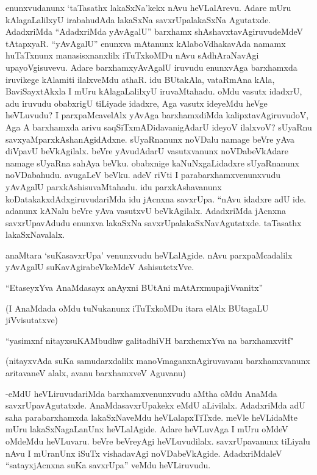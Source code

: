 enunxvudanunx `taTasathx lakaSxNa'kekx nAvu heVLalArevu. Adare mUru kAlagaLalilxyU irabahudAda lakaSxNa savxrUpalakaSxNa Agutatxde. AdadxriMda ``AdadxriMda yAvAgalU'' barxhamx shAshavxtavAgiruvudeMdeV tAtapxyaR. ``yAvAgalU'' enunxva mAtanunx kAlaboVdhakavAda namamx huTaTxnunx manasisxnanxlilx iTuTxkoMDu nAvu sAdhAraNavAgi upayoVgisuvevu. Adare barxhamxyAvAgalU iruvudu enunxvAga barxhamxda iruvikege kAlamiti ilalxveMdu athaR. idu BUtakAla, vataRmAna kAla, BaviSayxtAkxla I mUru kAlagaLalilxyU iruvaMtahadu. oMdu vasutx idadxrU, adu iruvudu obabxrigU tiLiyade idadxre, Aga vasutx ideyeMdu heVge heVLuvudu? I parxpaMcavelAlx yAvAga barxhamxdiMda kalipxtavAgiruvudoV, Aga A barxhamxda arivu saqSiTxmADidavanigAdarU ideyoV ilalxvoV? sUyaRnu savxyaMparxkAshanAgidAdxne. sUyaRnanunx noVDalu namage beVre yAva diVpavU beVkAgilalx. beVre yAvudAdarU vasutxvanunx noVDabeVkAdare namage sUyaRna sahAya beVku. obabxnige kaNuNxgaLidadxre sUyaRnanunx noVDabahudu. avugaLeV beVku. adeV riVti I parabarxhamxvenunxvudu yAvAgalU parxkAshisuvaMtahadu. idu parxkAshavanunx koDatakakxdAdxgiruvudariMda idu jAcnxna savxrUpa. ``nAvu idadxre adU ide. adanunx kANalu beVre yAva vasutxvU beVkAgilalx. AdadxriMda jAcnxna savxrUpavAdudu enunxva lakaSxNa savxrUpalakaSxNavAgutatxde. taTasathx lakaSxNavalalx.

anaMtara `suKasavxrUpa' venunxvudu heVLalAgide. nAvu parxpaMcadalilx yAvAgalU suKavAgirabeVkeMdeV AshisutetxVve.

\begin{shloka}
``EtaseyxYva AnaMdasayx anAyxni BUtAni mAtArxmupajiVvanitx''
\end{shloka}

(I AnaMdada oMdu tuNukanunx iTuTxkoMDu itara elAlx BUtagaLU jiVvisutatxve)

\begin{shloka}
``yasimxnf nitayxsuKAMbudhw galitadhiVH barxhemxYva na barxhamxvitf"
\end{shloka}

(nitayxvAda suKa samudarxdalilx manoVmaganxnAgiruvavanu barxhamxvanunx aritavaneV alalx, avanu barxhamxveV Aguvanu)


-eMdU heVLiruvudariMda barxhamxvenunxvudu aMtha oMdu AnaMda savxrUpavAgutatxde. AnaMdasavxrUpakekx eMdU aLivilalx. AdadxriMda adU saha parabarxhamxda lakaSxNaveMdu heVLalapxTiTxde. meVle heVLidaMte mUru lakaSxNagaLanUnx heVLalAgide. Adare heVLuvAga I mUru oMdeV oMdeMdu heVLuvaru. beVre beVreyAgi heVLuvudilalx. savxrUpavanunx tiLiyalu nAvu I mUranUnx iSuTx vishadavAgi noVDabeVkAgide. AdadxriMdaleV ``satayxjAcnxna suKa savxrUpa'' veMdu heVLiruvudu. 

